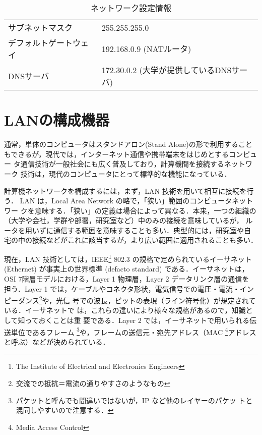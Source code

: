 \begin{table}[ht]
 \caption{ネットワーク設定情報}
 \label{tab:02:otherinfo}
 \vspace*{1zh}
 \begin{center}
  \begin{tabular}{l|l}
    \hline
     サブネットマスク　& 255.255.255.0\\
     デフォルトゲートウェイ & 192.168.0.9 (NATルータ)\\
     DNSサーバ & 172.30.0.2 (大学が提供しているDNSサーバ)\\
    \hline
  \end{tabular}
 \end{center}
\end{table}

\clearpage
\section{LANの構成機器}
通常，単体のコンピュータはスタンドアロン(Stand Alone)の形で利用すること
もできるが，現代では，インターネット通信や携帯端末をはじめとするコンピュー
タ通信技術が一般社会にも広く普及しており，計算機間を接続するネットワーク
技術は，現代のコンピュータにとって標準的な機能になっている．

計算機ネットワークを構成するには，まず，LAN 技術を用いて相互に接続を行う．
LAN は，Local Area Network の略で，「狭い」範囲のコンピュータネットワー
クを意味する．「狭い」の定義は場合によって異なる．本来，一つの組織の
（大学や会社，学群や部署，研究室など）中のみの接続を意味しているが，
ルータを用いずに通信する範囲を意味することも多い．典型的には，研究室や自
宅の中の接続などがこれに該当するが，より広い範囲に適用されることも多い．

現在，LAN 技術としては，IEEE\footnote{The Institute of Electrical and
Electronics Engineers} 802.3 の規格で定められているイーサネット
(Ethernet) が事実上の世界標準 (defacto standard) である．イーサネットは，
OSI 7階層モデルにおける，Layer 1 物理層，Layer 2 データリンク層の通信を
担う．Layer 1 では，ケーブルやコネクタ形状，電気信号での電圧・電流・イン
ピーダンス\footnote{交流での抵抗＝電流の通りやすさのようなもの}や，光信
号での波長，ビットの表現（ライン符号化）が規定されている．イーサネットで
は，これらの違いにより様々な規格があるので，知識として知っておくことは重
要である．Layer 2 では，イーサネットで用いられる伝送単位であるフレーム
\footnote{パケットと呼んでも間違いではないが，IP など他のレイヤーのパケッ
トと混同しやすいので注意する．}や，フレームの送信元・宛先アドレス（MAC
\footnote{Media Access Control}アドレスと呼ぶ）などが決められている．

